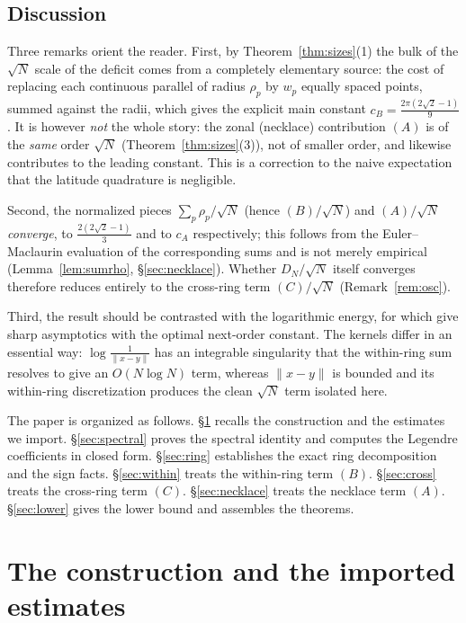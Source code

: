 \documentclass[11pt,reqno]{amsart}
\theoremstyle{definition}
\newcommand{\dist}[2]{\lVert #1-#2\rVert}
\newcommand{\Def}{D_N}
\newcommand{\rp}{\rho}
\begin{document}
\subsection{Discussion}
Three remarks orient the reader. First, by Theorem~\ref{thm:sizes}(1) the bulk of the $\sqrt N$ scale
of the deficit comes from a completely elementary source: the cost of replacing each continuous
parallel of radius $\rp_p$ by $w_p$ equally spaced points, summed against the radii, which gives the
explicit main constant $c_B=\frac{2\pi(2\sqrt2-1)}{9}$. It is however \emph{not} the whole story: the
zonal (necklace) contribution $(A)$ is of the \emph{same} order $\sqrt N$ (Theorem~\ref{thm:sizes}(3)),
not of smaller order, and likewise contributes to the leading constant. This is a correction to the
naive expectation that the latitude quadrature is negligible.

Second, the normalized pieces $\sum_p\rp_p/\sqrt N$ (hence $(B)/\sqrt N$) and $(A)/\sqrt N$
\emph{converge}, to $\tfrac{2(2\sqrt2-1)}{3}$ and to $c_A$ respectively; this follows from the
Euler--Maclaurin evaluation of the corresponding sums and is not merely empirical
(Lemma~\ref{lem:sumrho}, \S\ref{sec:necklace}). Whether $\Def/\sqrt N$ itself converges therefore
reduces entirely to the cross-ring term $(C)/\sqrt N$ (Remark~\ref{rem:osc}).

Third, the result should be contrasted with the logarithmic energy, for which \cite{BEMOC,Diamond}
give sharp asymptotics with the optimal next-order constant. The kernels differ in an essential
way: $\log\frac1{\dist{x}{y}}$ has an integrable singularity that the within-ring sum resolves to
give an $O(N\log N)$ term, whereas $\dist{x}{y}$ is bounded and its within-ring discretization
produces the clean $\sqrt N$ term isolated here.

The paper is organized as follows. \S\ref{sec:prelim} recalls the construction and the estimates we
import. \S\ref{sec:spectral} proves the spectral identity and computes the Legendre coefficients in
closed form. \S\ref{sec:ring} establishes the exact ring decomposition and the sign facts.
\S\ref{sec:within} treats the within-ring term $(B)$. \S\ref{sec:cross} treats the cross-ring term
$(C)$. \S\ref{sec:necklace} treats the necklace term $(A)$. \S\ref{sec:lower} gives the lower bound
and assembles the theorems.

\section{The construction and the imported estimates}\label{sec:prelim}
\end{document}
